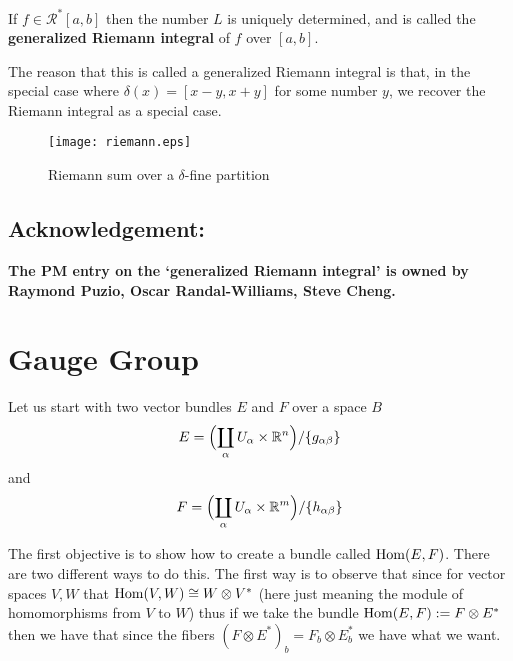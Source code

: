 \documentclass[12pt]{article}
\theoremstyle{plain}
\theoremstyle{definition}
\numberwithin{equation}{section}
\newcommand{\Hom}{{\rm Hom}}
\begin{document}
If $f \in \mathcal{R}^{*}[a,b]$ then the number $L$ is uniquely determined, and is called the \textbf{generalized Riemann integral} of $f$ over $[a,b]$.

The reason that this is called a generalized Riemann integral is that, in the special case where $\delta (x) = [x - y, x + y]$ for some number $y$, we recover the Riemann integral as a special case.

\begin{figure}[!htb]
\begin{center}
\texttt{[image: riemann.eps]}
\caption{Riemann sum over a $\delta$-fine partition}
\end{center}
\end{figure}

\subsection{Acknowledgement:}

{\bf The PM entry on the `generalized Riemann integral' is owned by Raymond Puzio, Oscar Randal-Williams, Steve Cheng.}


\section{Gauge Group}
Let us start with two vector bundles $ E $ and $ F $ over a space $ B $
\begin{equation*}
E = \Bigl ( \coprod_{\alpha} U_{\alpha} \times \mathbb{R}^{n} \Bigr ) /\{g_{\alpha \beta} \}
\end{equation*}
and
\begin{equation*}
F = \Bigl ( \coprod_{\alpha} U_{\alpha} \times \mathbb{R}^{m} \Bigr) /\{h_{\alpha \beta} \}
\end{equation*}

The first objective is to show how to create a bundle called $ \Hom(E,F) $. There are two different ways to do this. The first way is to observe that since for vector spaces $ V, W $ that $ \Hom(V,W) \cong W \otimes V^{\ast} $ (here just meaning the module of homomorphisms from $ V $ to $ W $) thus if we take the bundle $ \Hom(E,F) := F \otimes E^{\ast} $ then we have that since the fibers $ (F\otimes E^{\ast})_{b} = F_{b} \otimes E^{\ast}_{b} $ we have what we want.
\end{document}
